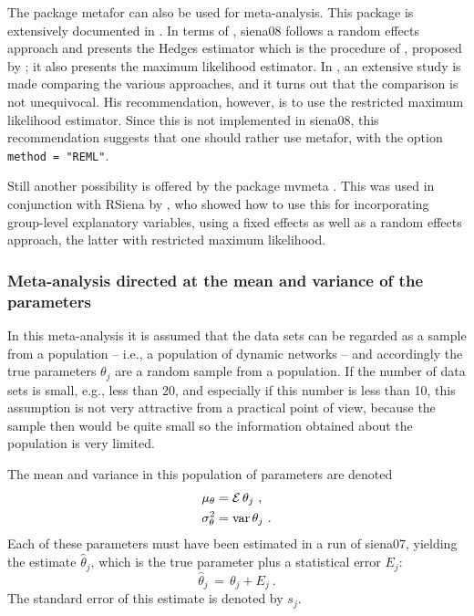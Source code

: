 \documentclass[a4paper,fleqn,11pt]{article}
\newcommand{\var}{\mbox{var}}
\newcommand{\+}{\, + \,}
\newcommand{\E}{\mbox{$\cal E$}}
\newcommand{\sfn}[1]{\textsf{#1}}
\newcommand{\RS}{{\sf \textsf{RSiena} }}
\begin{document}
The package \sfn{metafor} can also be used for meta-analysis.
This package is extensively documented in \citet{Viechtbauer2010}.
In terms of \citet{Viechtbauer2010}, \sfn{siena08} follows a
random effects approach and presents the Hedges estimator
which is the procedure of \citet{SnijdersBaerveldt03}, proposed
by \citet{Cochran54}; it also presents the maximum likelihood
estimator.
In \citet{Viechtbauer2005}, an extensive study is made comparing
the various approaches, and it turns out that the comparison is
not unequivocal. His recommendation, however, is to use the
restricted maximum likelihood estimator.
Since this is not implemented in \sfn{siena08}, this recommendation
suggests that one should rather use  \sfn{metafor}, with the
option \texttt{method = "REML"}.

Still another possibility is offered by the package \sfn{mvmeta}
\citep{Gasparrini2012}.
This was used in conjunction with \RS by
\citet{An2015}, who showed how to use this for incorporating
group-level explanatory variables, using a fixed effects
as well as a random effects approach, the latter with
restricted maximum likelihood.

\subsubsection{Meta-analysis directed at the mean
               and variance of the parameters}

In this meta-analysis it is assumed that the data sets can be
regarded as a sample from a population -- i.e., a population
of dynamic networks -- and accordingly the true parameters
$\theta_j$  are a random sample from a population.
If the number of data sets is small, e.g., less than 20,
and especially if this number is less than 10,
this assumption is not very attractive from a practical point of view,
because the sample then would be quite small
so the information obtained about the population is very limited.

The mean and variance in this population of parameters are denoted
\begin{align*}
 \mu_\theta &= \E\, \theta_j \ , \\
 \sigma^2_\theta &= \var\, \theta_j \ .
\end{align*}
Each of these parameters must have been estimated in a run of
\textsf{siena07}, yielding the estimate $\hat\theta_j$,
which is the true parameter plus a statistical error $E_j$:
\[
\hat\theta_j \,=\, \theta_j + E_j \ .
\]
The standard error of this estimate is denoted by $s_j$.
\end{document}
